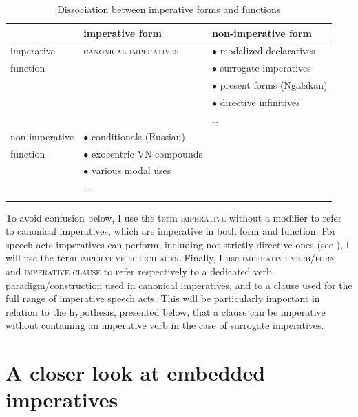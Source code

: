 \documentclass[output=paper,colorlinks,citecolor=brown]{langscibook}
\begin{document}
\begin{table}
	\caption{Dissociation between imperative forms and functions}
	\label{tab:form-function}
	{\small\begin{tabularx}{\textwidth}{lXX}
		\lsptoprule
                & imperative form      & non-imperative form   \\
		\midrule
imperative      & \textsc{canonical imperatives} &$\bullet$ modalized declaratives \\
function        &                                &$\bullet$ surrogate imperatives  \\
                &                                &$\bullet$ present forms (Ngalakan) \\
                &                                &$\bullet$ directive infinitives \\
                &                                &\phantom{$\bullet$} \dots        \\[1ex]
non-imperative  &$\bullet$ conditionals (Russian)&\cellcolor{gray!50}\\
function        &$\bullet$ exocentric VN compounds &\cellcolor{gray!50}\\
                &$\bullet$ various modal uses    &\cellcolor{gray!50}\\
                &\phantom{$\bullet$} \dots       &\cellcolor{gray!50}\\
		\lspbottomrule
	\end{tabularx}}
\end{table}

To avoid confusion below, I use the term \textsc{imperative} without a modifier to refer to canonical imperatives, which are imperative in both form and function. 
For speech acts imperatives can perform, including not strictly directive ones (see ), I will use the term \textsc{imperative speech acts}.
Finally, I use \textsc{imperative verb/form} and \textsc{imperative clause} to refer respectively to a dedicated verb paradigm/construction used in canonical imperatives, and to a clause used for the full range of imperative speech acts. This will be particularly important in relation to the hypothesis, presented below, that a clause can be imperative without containing an imperative verb in the case of surrogate imperatives.

\section{A closer look at embedded imperatives}
\label{sec:status}
\end{document}
